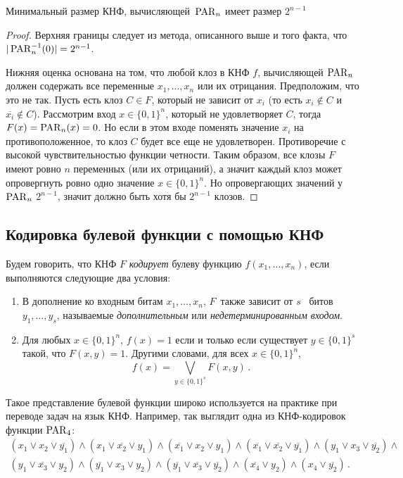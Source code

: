 \begin{lemma}\label{lemma:detparity}
	Минимальный размер КНФ, вычисляющей~$\operatorname{PAR}_n$ имеет размер $2^{n-1}$
\end{lemma}
\begin{proof}
	Верхняя границы следует из метода, описанного выше и того факта, что $|\operatorname{PAR}_n^{-1}(0)|=2^{n-1}$.
	
	Нижняя оценка основана на том, что любой клоз в КНФ $f$, вычисляющей $\operatorname{PAR}_n$ должен содержать все переменные $x_1, \dotsc, x_n$ или их отрицания. 
	Предположим, что это не так.
	Пусть есть клоз $C \in F$, который не зависит от $x_i$ (то есть $x_i \not \in C$ и $\overline{x_i} \not \in C$).
	Рассмотрим вход $x \in \{0, 1\}^n$, который не удовлетворяет $C$, 
	тогда $F(x)=\operatorname{PAR}_n(x)=0$. 
	Но если в этом входе поменять значение $x_i$ на противоположенное, 
	то клоз $C$ будет все еще не удовлетворен. 
	Противоречие с высокой чувствительностью функции четности. 
	Таким образом, все клозы $F$ имеют ровно $n$ переменных (или их отрицаний), 
	а значит каждый клоз может опровергнуть ровно одно значение
	 $x \in \{0, 1\}^n$. 
	Но опровергающих значений у $\operatorname{PAR}_n$ $2^{n-1}$, значит должно быть хотя бы $2^{n - 1}$ клозов.
	
\end{proof}

\subsection{Кодировка булевой функции с помощью КНФ}
Будем говорить, что КНФ $F$ \emph{кодирует} булеву функцию $f(x_1, \dotsc, x_n)$, если выполняются следующие два условия:
\begin{enumerate}
	\item В дополнение ко входным битам $x_1, \dotsc, x_n$, $F$~также зависит от  $s$~ битов $y_1, \dotsc, y_s$, называемые \emph{дополнительным} или \emph{недетерминированным входом}.
	\item Для любых $x \in \{0,1\}^n$, $f(x)=1$ если и только если существует $y \in \{0,1\}^s$ такой, что $F(x,y)=1$. Другими словами, для всех $x \in \{0,1\}^n$,
	\begin{equation}\label{eq:enc}
		f(x) = \bigvee_{y \in \{0,1\}^s}F(x,y) \, .
	\end{equation}
\end{enumerate}
Такое представление булевой функции широко используется на практике при переводе задач на язык КНФ. Например, так выглядит одна из КНФ-кодировок функции $\operatorname{PAR}_4$: 
\begin{multline}\label{eq:toyenc}
	(x_1 \lor x_2 \lor \overline{y_1}) \land (x_1 \lor  \overline{x_2} \lor y_1) \land (\overline{x_1} \lor x_2 \lor y_1) \land (\overline{x_1} \lor \overline{x_2} \lor \overline{y_1})
	\land
	(y_1 \lor x_3 \lor \overline{y_2}) \land\\ (y_1 \lor  \overline{x_3} \lor y_2) \land (\overline{y_1} \lor x_3 \lor y_2) \land (\overline{y_1} \lor \overline{x_3} \lor \overline{y_2})
	\land (\overline{x_4} \lor y_2) \land (x_4 \lor \overline{y_2}) \, .
\end{multline}
